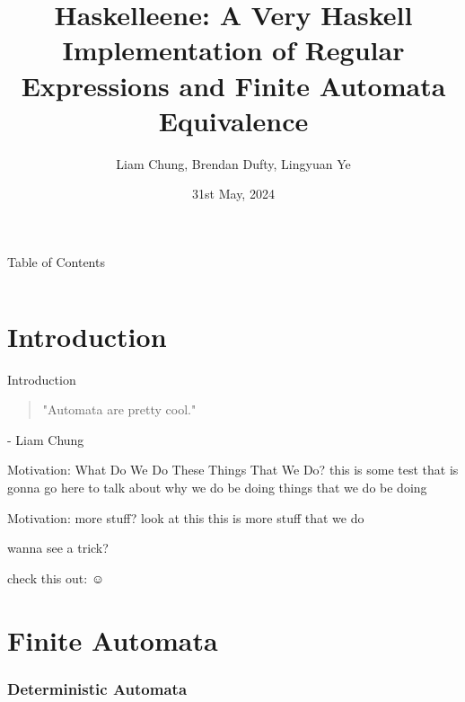 \documentclass{beamer}
\title{Haskelleene: A Very Haskell Implementation of Regular Expressions and Finite Automata Equivalence}
\author{Liam Chung, Brendan Dufty, Lingyuan Ye}
\date{31st May, 2024}
\begin{document}
\frame{\titlepage}

\begin{frame}{Table of Contents}
\begin{columns}[t]
    \begin{column}{.5\textwidth}
        \tableofcontents[sections={1-4}, hideallsubsections]
    \end{column}
    \begin{column}{.5\textwidth}
        \tableofcontents[sections={5-8}, hideallsubsections]
    \end{column}
\end{columns}
\end{frame}

\section{Introduction}
    \begin{frame}{Introduction}
        \begin{quote}
            "Automata are pretty cool."
        \end{quote}
        - Liam Chung
    \end{frame}

    \begin{frame}{Motivation: What Do We Do These Things That We Do?}
      this is some test that is gonna go here to talk about why we do be doing things that we do be doing
    \end{frame}

    \begin{frame}{Motivation: more stuff?}
      look at this this is more stuff that we do

      wanna see a trick?

      check this out: \pause $\smiley$
    \end{frame}

\section{Finite Automata}
  \begin{frame}
    \frametitle{Deterministic Automata}

  \end{frame}
\end{document}
